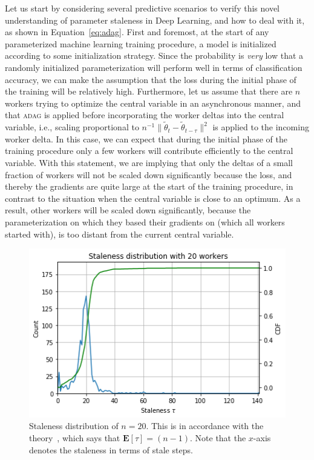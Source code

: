 Let us start by considering several predictive scenarios to verify this novel understanding of parameter staleness in Deep Learning, and how to deal with it, as shown in Equation~\ref{eq:adag}. First and foremost, at the start of any parameterized machine learning training procedure, a model is initialized according to some initialization strategy. Since the probability is \emph{very} low that a randomly initialized parameterization will perform well in terms of classification accuracy, we can make the assumption that the loss during the initial phase of the training will be relatively high. Furthermore, let us assume that there are $n$ workers trying to optimize the central variable in an asynchronous manner, and that \textsc{adag} is applied before incorporating the worker deltas into the central variable, i.e., scaling proportional to $n^{-1}\|\tilde{\theta}_t - \tilde{\theta}_{t - \tau}\|^2$ is applied to the incoming worker delta. In this case, we can expect that during the initial phase of the training procedure only a few workers will contribute efficiently to the central variable. With this statement, we are implying that only the deltas of a small fraction of workers will not be scaled down significantly because the loss, and thereby the gradients are quite large at the start of the training procedure, in contrast to the situation when the central variable is close to an optimum. As a result, other workers will be scaled down significantly, because the parameterization on which they based their gradients on (which all workers started with), is too distant from the current central variable.

\begin{figure}[H]
  \centering
  \includegraphics[width=.4\textwidth]{resources/images/plots/adag_agn_mnist/epoch_40/15/000000001/staleness_distribution}
  \caption{Staleness distribution of $n = 20$. This is in accordance with the theory~\cite{implicitmomentum}, which says that $\mathbf{E}[\tau] = (n - 1)$. Note that the $x$-axis denotes the staleness in terms of stale steps.}
  \label{fig:staleness_increasing}
\end{figure}

